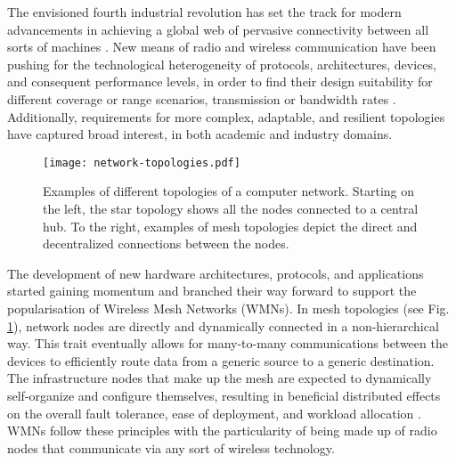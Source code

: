 The envisioned fourth industrial revolution has set the track for modern advancements in achieving a global web of pervasive connectivity between all sorts of machines \cite{akyildiz2005wireless, cilfone2019wireless}. New means of radio and wireless communication have been pushing for the technological heterogeneity of protocols, architectures, devices, and consequent performance levels, in order to find their design suitability for different coverage or range scenarios, transmission or bandwidth rates \cite{sichitiu2005wireless}. Additionally, requirements for more complex, adaptable, and resilient topologies have captured broad interest, in both academic and industry domains. 

\begin{figure} [ht]
  \begin{center}
  \texttt{[image: network-topologies.pdf]}
  \caption{Examples of different topologies of a computer network. Starting on the left, the star topology shows all the nodes connected to a central hub. To the right, examples of mesh topologies depict the direct and decentralized connections between the nodes.}
  \label{fig:mesh-network-topology}
  \end{center}
\end{figure}

The development of new hardware architectures, protocols, and applications started gaining momentum and branched their way forward to support the popularisation of Wireless Mesh Networks (WMNs). In mesh topologies (see Fig. \ref{fig:mesh-network-topology}), network nodes are directly and dynamically connected in a non-hierarchical way. This trait eventually allows for many-to-many communications between the devices to efficiently route data from a generic source to a generic destination. The infrastructure nodes that make up the mesh are expected to dynamically self-organize and configure themselves, resulting in beneficial distributed effects on the overall fault tolerance, ease of deployment, and workload allocation \cite{cilfone2019wireless, sichitiu2005wireless}. WMNs follow these principles with the particularity of being made up of radio nodes that communicate via any sort of wireless technology.

